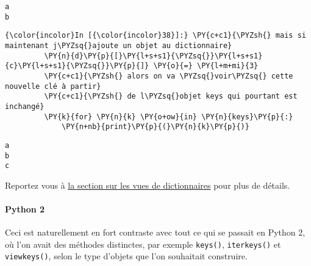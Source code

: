     \begin{Verbatim}[commandchars=\\\{\}]
a
b

    \end{Verbatim}

    \begin{Verbatim}[commandchars=\\\{\}]
{\color{incolor}In [{\color{incolor}38}]:} \PY{c+c1}{\PYZsh{} mais si maintenant j\PYZsq{}ajoute un objet au dictionnaire}
         \PY{n}{d}\PY{p}{[}\PY{l+s+s1}{\PYZsq{}}\PY{l+s+s1}{c}\PY{l+s+s1}{\PYZsq{}}\PY{p}{]} \PY{o}{=} \PY{l+m+mi}{3}
         \PY{c+c1}{\PYZsh{} alors on va \PYZsq{}voir\PYZsq{} cette nouvelle clé à partir}
         \PY{c+c1}{\PYZsh{} de l\PYZsq{}objet keys qui pourtant est inchangé}
         \PY{k}{for} \PY{n}{k} \PY{o+ow}{in} \PY{n}{keys}\PY{p}{:}
             \PY{n+nb}{print}\PY{p}{(}\PY{n}{k}\PY{p}{)}
\end{Verbatim}


    \begin{Verbatim}[commandchars=\\\{\}]
a
b
c

    \end{Verbatim}

    Reportez vous à
\href{https://docs.python.org/3/library/stdtypes.html\#dictionary-view-objects}{la
section sur les vues de dictionnaires} pour plus de détails.

    \hypertarget{python-2}{%
\paragraph{Python 2}\label{python-2}}

    Ceci est naturellement en fort contraste avec tout ce qui se passait en
Python 2, où l'on avait des méthodes distinctes, par exemple
\texttt{keys()}, \texttt{iterkeys()} et \texttt{viewkeys()}, selon le
type d'objets que l'on souhaitait construire.